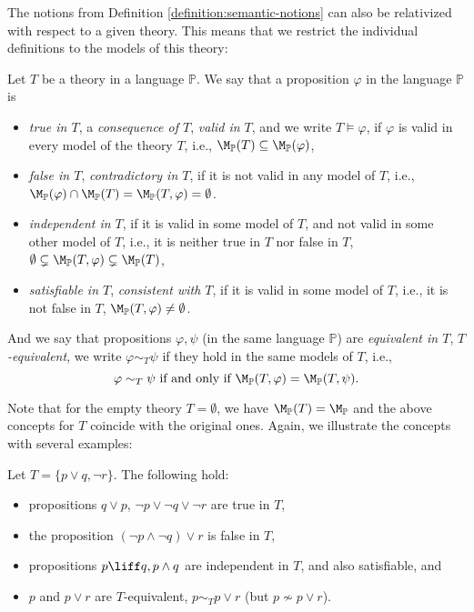 The notions from Definition \ref{definition:semantic-notions} can also be relativized with respect to a given theory. This means that we restrict the individual definitions to the models of this theory:

\begin{definition}
    Let $T$ be a theory in a language $\mathbb P$. We say that a proposition $\varphi$ in the language $\mathbb P$ is
    \begin{itemize}
        \item \emph{true in $T$}, a \emph{consequence of $T$}, \emph{valid in $T$}, and we write $T \models \varphi$, if $\varphi$ is valid in every model of the theory $T$, i.e., $\M_\mathbb P(T) \subseteq \M_\mathbb P(\varphi)$,
        \item \emph{false in $T$}, \emph{contradictory in $T$}, if it is not valid in any model of $T$, i.e., $\M_\mathbb P(\varphi) \cap \M_\mathbb P(T) = \M_\mathbb P(T,\varphi) = \emptyset$.
        \item \emph{independent in $T$}, if it is valid in some model of $T$, and not valid in some other model of $T$, i.e., it is neither true in $T$ nor false in $T$, $\emptyset \subsetneq \M_\mathbb P(T,\varphi) \subsetneq \M_\mathbb P(T)$,
        \item \emph{satisfiable in $T$}, \emph{consistent with $T$}, if it is valid in some model of $T$, i.e., it is not false in $T$, $\M_\mathbb P(T,\varphi) \neq \emptyset$.
    \end{itemize}
    And we say that propositions $\varphi, \psi$ (in the same language $\mathbb P$) are \emph{equivalent in $T$}, \emph{$T$-equivalent}, we write $\varphi \sim_T \psi$ if they hold in the same models of $T$, i.e.,
    $$
    \varphi \sim_T \psi \text{ if and only if } \M_\mathbb P(T,\varphi) = \M_\mathbb P(T,\psi).
    $$
\end{definition}

Note that for the empty theory $T = \emptyset$, we have $\M_\mathbb P(T) = \M_\mathbb P$ and the above concepts for $T$ coincide with the original ones. Again, we illustrate the concepts with several examples:

\begin{example} Let $T = \{p \lor q, \neg r\}$. The following hold:
    \begin{itemize}
        \item propositions $q \lor p$, $\neg p \lor \neg q \lor \neg r$ are true in $T$,
        \item the proposition $(\neg p \land \neg q) \lor r$ is false in $T$,
        \item propositions $p \liff q, p \land q$ are independent in $T$, and also satisfiable, and
        \item $p$ and $p\lor r$ are $T$-equivalent, $p \sim_T p \lor r$ (but $p \not\sim p \lor r$).
    \end{itemize}      
\end{example}


